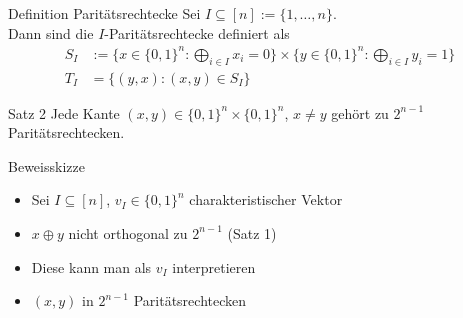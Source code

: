 \begin{frame}
    \begin{block}{Definition Parit\"atsrechtecke}
        Sei $I \subseteq [n] := \{1,\dots,n\}$.\\
        Dann sind die $I$-Parit\"atsrechtecke definiert als
        \begin{align*}
            S_I &:= \{ x \in \{0,1\}^n : \bigoplus_{i \in I} x_i = 0 \}
            \times \{ y \in \{0,1\}^n : \bigoplus_{i \in I} y_i = 1 \}\\
            T_I &= \{(y,x) : (x,y) \in S_I\}
        \end{align*}
    \end{block}
\end{frame}

\begin{frame}{}
    \begin{block}{Satz 2}
        Jede Kante $(x,y) \in \{0,1\}^n \times \{0,1\}^n$, $x\neq y$ geh\"ort zu $2^{n-1}$ Parit\"atsrechtecken.
    \end{block}
    \pause
    \begin{block}{Beweisskizze}
        \begin{itemize}
            \item Sei $I \subseteq [n]$, $v_I \in \{0,1\}^n$ charakteristischer Vektor
        \end{itemize}
        \pause
        \begin{itemize}
            \item $x \oplus y$ nicht orthogonal zu $2^{n-1}$ (Satz 1)
        \end{itemize}
        \pause
        \begin{itemize}
            \item Diese kann man als $v_I$ interpretieren
        \end{itemize}
        \pause
        \begin{itemize}
            \item $(x,y)$ in $2^{n-1}$ Parit\"atsrechtecken
        \end{itemize}
    \end{block}
\end{frame}

